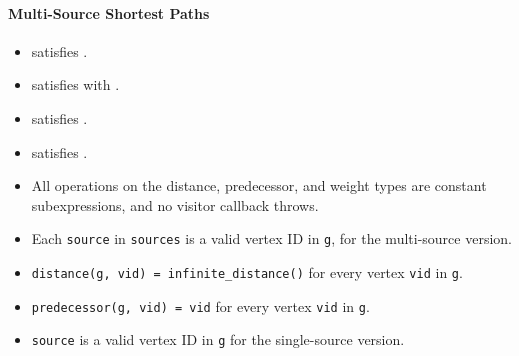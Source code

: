 \paragraph{Multi-Source Shortest Paths}
{\small
      
}

\begin{itemdescr}
      \pnum\mandates
            \begin{itemize}
                  \item {} satisfies .
                  \item {} satisfies 
                        with .
                  \item {} satisfies .
                  \item {} satisfies .
            \end{itemize}
      \pnum\constantwhen
            \begin{itemize}
                  \item All operations on the distance, predecessor, and weight types
                        are constant subexpressions, and no visitor callback throws.
            \end{itemize}
      \pnum\preconditions
            \begin{itemize}
                  \item
                        Each \lstinline{source} in \lstinline{sources} is a valid vertex ID in \lstinline{g},
                        for the multi-source version.
                  \item
                        \lstinline{distance(g, vid) = infinite_distance()} for every vertex \lstinline{vid} in \lstinline{g}.
                  \item
                        \lstinline{predecessor(g, vid) = vid} for every vertex \lstinline{vid} in \lstinline{g}.
            \end{itemize}
      \pnum\hardprecond
            \begin{itemize}
                  \item \lstinline{source} is a valid vertex ID in \lstinline{g} for the single-source version.
            \end{itemize}

\end{itemdescr}
